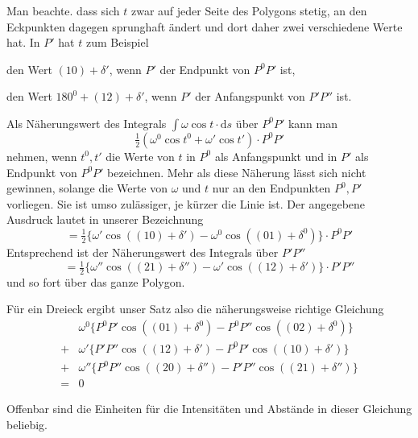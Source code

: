 Man beachte. dass sich $t$ zwar auf jeder Seite des Polygons stetig, an den Eckpunkten dagegen sprunghaft ändert und dort daher zwei verschiedene Werte hat. In $P'$ hat $t$ zum Beispiel

den Wert $(10)+\delta'$, wenn $P'$ der Endpunkt von $P^0P'$ ist,

den Wert $180^0+(12)+\delta'$, wenn $P'$ der Anfangspunkt von $P'P''$ ist.

Als Näherungswert des Integrals $\int\omega\cos t\cdot\mathrm{d}s$ über $P^0P'$ kann man
\[
\tfrac12(\omega^0\cos t^0+\omega'\cos t')\cdot P^0P'
\]
nehmen, wenn $t^0,t'$ die Werte von $t$ in $P^0$ als Anfangspunkt und in $P'$ als Endpunkt von $P^0P'$ bezeichnen. Mehr als diese Näherung lässt sich nicht gewinnen, solange die Werte von $\omega$ und $t$ nur an den Endpunkten $P^0,P'$ vorliegen. Sie ist umso zulässiger, je kürzer die Linie ist. Der angegebene Ausdruck lautet in unserer Bezeichnung
\[
=\tfrac12\{\omega'\cos((10)+\delta')-\omega^0\cos((01)+\delta^0)\}\cdot P^0P'
\]
Entsprechend ist der Näherungswert des Integrals über $P'P''$
\[
=\tfrac12\{\omega''\cos((21)+\delta'')-\omega'\cos((12)+\delta')\}\cdot P'P''
\]
und so fort über das ganze Polygon.

Für ein Dreieck ergibt unser Satz also die näherungsweise richtige Gleichung
\[
\begin{aligned}
&\omega^0\{P^0P'\cos((01)+\delta^0)-P^0P''\cos((02)+\delta^0)\}\\
{}+{}&\omega'\{P'P''\cos((12)+\delta')-P^0P'\cos((10)+\delta')\}\\
{}+{}&\omega''\{P^0P''\cos((20)+\delta'')-P'P''\cos((21)+\delta'')\}\\
={}&0
\end{aligned}
\]

Offenbar sind die Einheiten für die Intensitäten und Abstände in dieser Gleichung beliebig.

